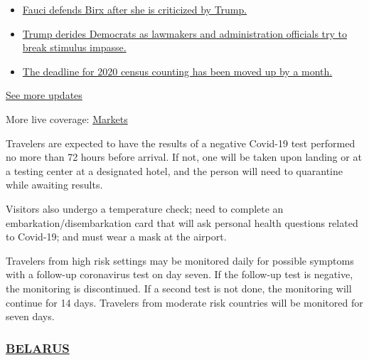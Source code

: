 \begin{itemize}
\tightlist
\item
  \href{https://www.nytimes3xbfgragh.onion/2020/08/03/world/coronavirus-covid-19.html?action=click\&pgtype=Article\&state=default\&region=MAIN_CONTENT_1\&context=storylines_live_updates\#link-4547638f}{Fauci
  defends Birx after she is criticized by Trump.}
\item
  \href{https://www.nytimes3xbfgragh.onion/2020/08/03/world/coronavirus-covid-19.html?action=click\&pgtype=Article\&state=default\&region=MAIN_CONTENT_1\&context=storylines_live_updates\#link-15e7f995}{Trump
  derides Democrats as lawmakers and administration officials try to
  break stimulus impasse.}
\item
  \href{https://www.nytimes3xbfgragh.onion/2020/08/03/world/coronavirus-covid-19.html?action=click\&pgtype=Article\&state=default\&region=MAIN_CONTENT_1\&context=storylines_live_updates\#link-e5a2cda}{The
  deadline for 2020 census counting has been moved up by a month.}
\end{itemize}

\href{https://www.nytimes3xbfgragh.onion/2020/08/03/world/coronavirus-covid-19.html?action=click\&pgtype=Article\&state=default\&region=MAIN_CONTENT_1\&context=storylines_live_updates}{See
more updates}

More live coverage:
\href{https://www.nytimes3xbfgragh.onion/live/2020/08/03/business/stock-market-today-coronavirus?action=click\&pgtype=Article\&state=default\&region=MAIN_CONTENT_1\&context=storylines_live_updates}{Markets}

Travelers are expected to have the results of a negative Covid-19 test
performed no more than 72 hours before arrival. If not, one will be
taken upon landing or at a testing center at a designated hotel, and the
person will need to quarantine while awaiting results.

Visitors also undergo a temperature check; need to complete an
embarkation/disembarkation card that will ask personal health questions
related to Covid-19; and must wear a mask at the airport.

Travelers from high risk settings may be monitored daily for possible
symptoms with a follow-up coronavirus test on day seven. If the
follow-up test is negative, the monitoring is discontinued. If a second
test is not done, the monitoring will continue for 14 days. Travelers
from moderate risk countries will be monitored for seven days.

\hypertarget{belarus}{%
\subsubsection{\texorpdfstring{\href{https://by.usembassy.gov/u-s-citizen-services/covid-19-information/}{BELARUS}}{BELARUS}}\label{belarus}}

